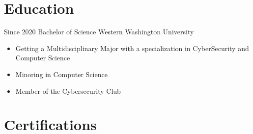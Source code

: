 \documentclass[letterpaper]{twentysecondcv} %
\begin{document}
\makeprofile %





\section{Education}

\begin{twenty} %
	\twentyitem
	{Since 2020}
	{Bachelor of Science}
	{Western Washington University}
	{\begin{itemize}
			\item Getting a Multidisciplinary Major with a specialization in CyberSecurity and Computer Science
			\item Minoring in Computer Science
			\item Member of the Cybersecurity Club
		\end{itemize}}
\end{twenty}


\section{Certifications}
\end{document}
